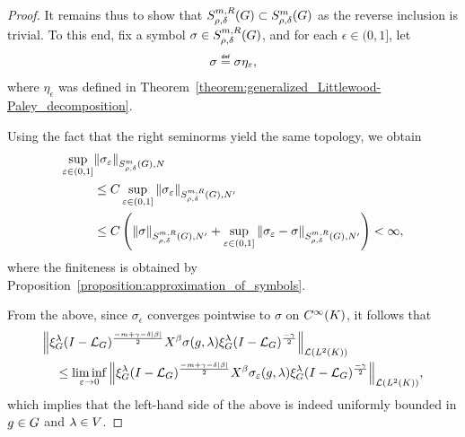 \begin{proof}
    It remains thus to show that $\SymbolClass {m, R} {\rho, \delta} \subset \SymbolClass m {\rho, \delta}$
    as the reverse inclusion is trivial.
    To this end,
    fix a symbol $\sigma \in \SymbolClass {m, R} {\rho, \delta}$,
    and for each $\epsilon \in (0, 1]$,
    let
    \begin{align*}
        \sigma \defeq \sigma \eta_\epsilon,
    \end{align*}
    where $\eta_\epsilon$ was defined in Theorem~\ref{theorem:generalized_Littlewood-Paley_decomposition}.

    Using the fact that the right seminorms yield the same topology,
    we obtain
    \begin{align*}
        \sup_{\epsilon \in (0, 1]} &\SymbolSemiNorm m {\rho, \delta} N {\sigma_\epsilon}\\
        &\leq C
        \sup_{\epsilon \in (0, 1]} \SymbolSemiNorm {m, R} {\rho, \delta} {N'} {\sigma_\epsilon}\\
        &\leq C
        \left(
        \SymbolSemiNorm {m, R} {\rho, \delta} {N'} {\sigma} +
        \sup_{\epsilon \in (0, 1]}
        \SymbolSemiNorm {m, R} {\rho, \delta} {N'} {\sigma_\epsilon - \sigma}
        \right) < \infty,
    \end{align*}
    where the finiteness is obtained by Proposition~\ref{proposition:approximation_of_symbols}.

    From the above,
    since $\sigma_\epsilon$ converges pointwise to $\sigma$ on $\SmoothFunctions \CompactGroup$,
    it follows that
    \begin{align*}
        &\norm [\Lin {\Lebesgue 2 \CompactGroup}] {%
            \Rep \lambda \BesselPotential {-m + \gamma - \delta \abs \beta}
            \LeftDifferentialOperator \beta
            \sigma(g, \lambda)
            \Rep \lambda \BesselPotential {-\gamma}
        }
        \\
        &\quad \leq
        \liminf_{\epsilon \to 0}
        \norm [\Lin {\Lebesgue 2 \CompactGroup}] {%
            \Rep \lambda \BesselPotential {-m + \gamma - \delta \abs \beta}
            \LeftDifferentialOperator \beta
            \sigma_\epsilon(g, \lambda)
            \Rep \lambda \BesselPotential {-\gamma}
        },
    \end{align*}
    which implies that the left-hand side of the above
    is indeed uniformly bounded in $g \in \Group$ and $\lambda \in \VectorSpace$.


\end{proof}
